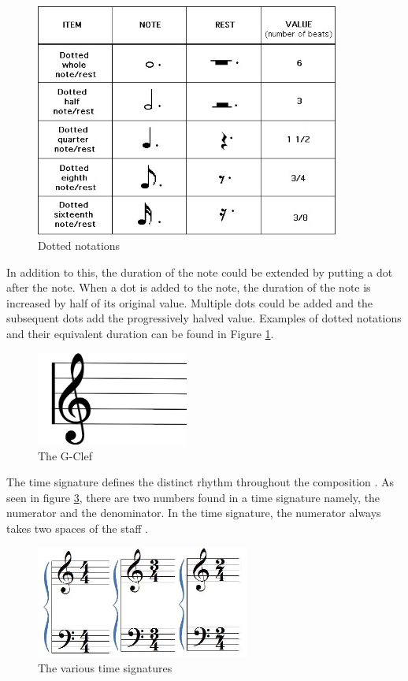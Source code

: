 \begin{figure}[H]
    \centering
    \includegraphics[width=10cm ]{figures/dotted_notes_chart.jpg}
    \caption{Dotted notations \protect\cite{DottedNotes2015}}
    \label{fig:DottedNotes2015}
\end{figure}

In addition to this, the duration of the note could be extended by putting a dot after the note. When a dot is added to the note, the duration of the note is increased by half of its original value. Multiple dots could be added and the subsequent dots add the progressively halved value. Examples of dotted notations and their equivalent duration can be found in Figure \ref{fig:DottedNotes2015}.

\begin{figure}[H]
    \centering
    \includegraphics[width=5cm ]{figures/G-clef.jpg}
    \caption{The G-Clef \protect\cite{G-Clef}}
    \label{fig:G-Clef}
\end{figure}

The time signature defines the distinct rhythm throughout the composition \cite{rivadelo1986fundamentals}. As seen in figure \ref{fig:Time-Signature}, there are two numbers found in a time signature namely, the numerator and the denominator. In the time signature, the numerator always takes two spaces of the staff \cite{read1964music, rivadelo1986fundamentals, burrows1999read}.

\begin{figure}[H]
    \centering
    \includegraphics[width=7cm ]{figures/Time-Signature.jpg}
    \caption{The various time signatures \protect\cite{Time-Signature}}
    \label{fig:Time-Signature}
\end{figure}

